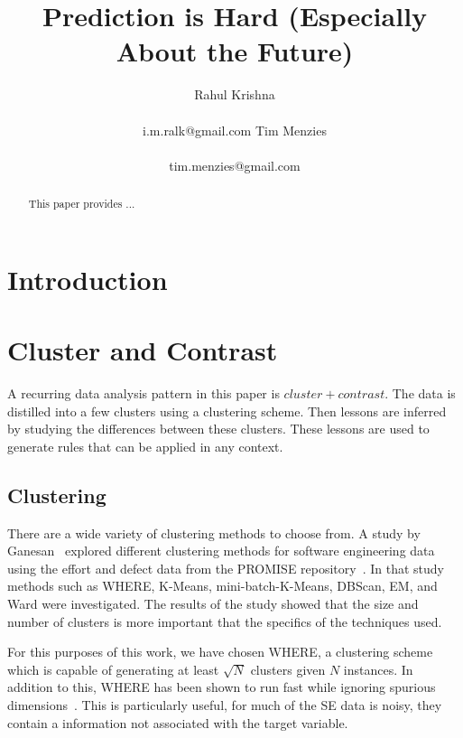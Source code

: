 \documentclass{sig-alternate}
\begin{document}
  

\title{Prediction is Hard (Especially About the Future)}
\author{
\alignauthor 
Rahul Krishna \\
       \\
       {i.m.ralk@gmail.com}
\alignauthor
Tim Menzies\\
       \\
       {tim.menzies@gmail.com}}
\setlength{\columnsep}{7mm}

\maketitle
\begin{abstract}
This paper provides ...  
\end{abstract}
\section{Introduction}

\section{Cluster and Contrast}

A recurring data analysis pattern in this paper is $cluster+contrast$. The data is distilled into a few clusters using a clustering scheme. Then lessons are inferred by studying the differences between these clusters. These lessons are used to generate rules that can be applied in any context.

\subsection{Clustering}
There are a wide variety of clustering methods to choose from. A study by Ganesan~\cite{div14} explored different clustering methods for software engineering data using the effort and defect data from the PROMISE repository~\cite{promise}. In that study methods such as WHERE, K-Means, mini-batch-K-Means, DBScan, EM, and Ward were investigated. The results of the study showed that the size and number of clusters is more important that the specifics of the techniques used. 

For this purposes of this work, we have chosen WHERE, a clustering scheme which is capable of generating at least $\sqrt{N}$ clusters given $N$ instances. In addition to this, WHERE has been shown to run fast while ignoring spurious dimensions~\cite{menzies2013}. This is particularly useful, for much of the SE data is noisy, they contain a information not associated with the target variable. 
\end{document}
